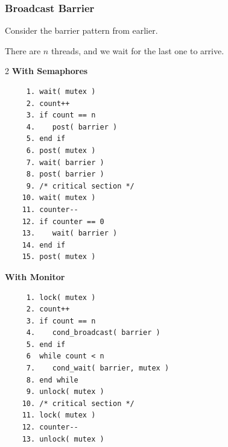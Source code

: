 \begin{frame}[fragile]
	\frametitle{Broadcast Barrier}

	Consider the barrier pattern from earlier.

	There are $n$ threads, and we wait for the last one to arrive.
		{\small
			\begin{multicols}{2}
				\textbf{With Semaphores}
				\begin{verbatim}
	 1. wait( mutex )
	 2. count++
	 3. if count == n
	 4.    post( barrier )
	 5. end if
	 6. post( mutex )
	 7. wait( barrier )
	 8. post( barrier )
	 9. /* critical section */
	10. wait( mutex )
	11. counter--
	12. if counter == 0
	13.    wait( barrier )
	14. end if
	15. post( mutex )
  				\end{verbatim}
				\columnbreak
				\textbf{With Monitor}\vspace{-2em}
				\begin{verbatim}
	 1. lock( mutex )
	 2. count++
	 3. if count == n
	 4.    cond_broadcast( barrier )
	 5. end if
	 6  while count < n
	 7.    cond_wait( barrier, mutex )
	 8. end while
	 9. unlock( mutex )
	10. /* critical section */
	11. lock( mutex )
	12. counter--
	13. unlock( mutex )


  				\end{verbatim}
			\end{multicols}
		}


\end{frame}


